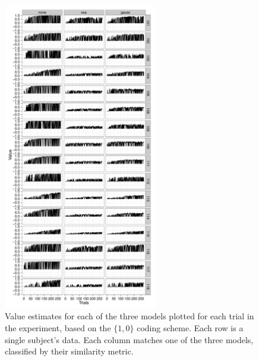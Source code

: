 \documentclass[doc,12pt]{apa}        %
\begin{document}
\begin{figure}[tp]
	\includegraphics[width=0.6\textwidth]{f_value_acc}
    \centering    
	\caption{Value estimates for each of the three models plotted for each trial in the experiment, based on the $\{1,0\}$ coding scheme.  Each row is a single subject's data.  Each column matches one of the three models, classified by their similarity metric.}
	\label{fig:valueacc}
\end{figure}
\end{document}
